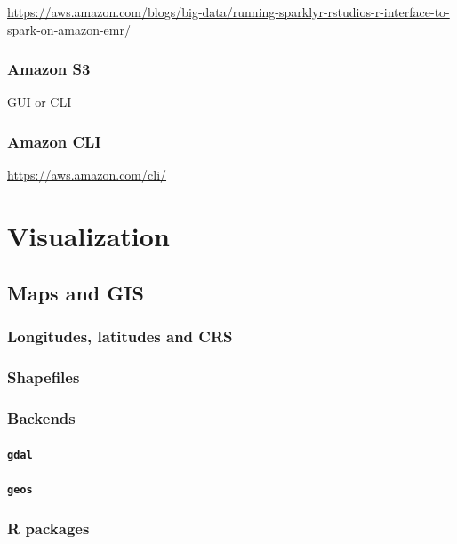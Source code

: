 \documentclass[]{book}
\theoremstyle{definition}
\theoremstyle{definition}
\theoremstyle{definition}
\theoremstyle{remark}
\begin{document}
\url{https://aws.amazon.com/blogs/big-data/running-sparklyr-rstudios-r-interface-to-spark-on-amazon-emr/}

\subsection{Amazon S3}\label{amazon-s3}

GUI or CLI

\subsection{Amazon CLI}\label{amazon-cli}

\url{https://aws.amazon.com/cli/}

\chapter{Visualization}\label{visualization}

\section{Maps and GIS}\label{maps-and-gis}

\subsection{Longitudes, latitudes and
CRS}\label{longitudes-latitudes-and-crs}

\subsection{Shapefiles}\label{shapefiles}

\subsection{Backends}\label{backends}

\subsubsection{\texorpdfstring{\texttt{gdal}}{gdal}}\label{gdal}

\subsubsection{\texorpdfstring{\texttt{geos}}{geos}}\label{geos}

\subsection{R packages}\label{r-packages}
\end{document}
